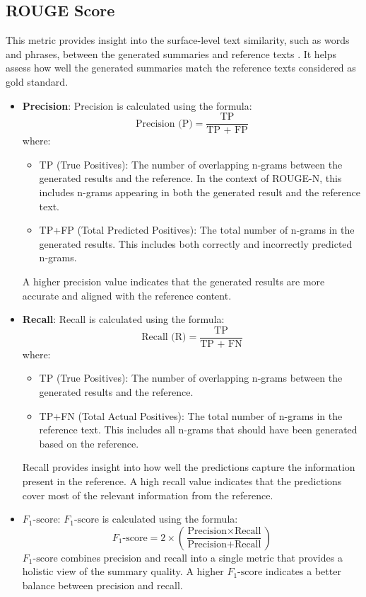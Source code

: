 \documentclass[runningheads]{llncs}
\begin{document}
\subsection{ROUGE Score}
This metric provides insight into the surface-level text similarity, such as words and phrases, between the generated summaries and reference texts \cite{Lin2004}. It helps assess how well the generated summaries match the reference texts considered as gold standard.
\begin{itemize}
    \item \textbf{Precision}: Precision is calculated using the formula:
    \[
    \text{Precision (P)} = \frac{\text{TP}}{\text{TP + FP}}
    \]
    where:
    \begin{itemize}
        \item TP (True Positives): The number of overlapping n-grams between the generated results and the reference. In the context of ROUGE-N, this includes n-grams appearing in both the generated result and the reference text.
        \item TP+FP (Total Predicted Positives): The total number of n-grams in the generated results. This includes both correctly and incorrectly predicted n-grams.
    \end{itemize}
    A higher precision value indicates that the generated results are more accurate and aligned with the reference content.

    \item \textbf{Recall}: Recall is calculated using the formula:
    \[
    \text{Recall (R)} = \frac{\text{TP}}{\text{TP + FN}}
    \]
    where:
    \begin{itemize}
        \item TP (True Positives): The number of overlapping n-grams between the generated results and the reference.
        \item TP+FN (Total Actual Positives): The total number of n-grams in the reference text. This includes all n-grams that should have been generated based on the reference.
    \end{itemize}
    Recall provides insight into how well the predictions capture the information present in the reference. A high recall value indicates that the predictions cover most of the relevant information from the reference.

    \item \textbf{\( F_{1}\text{-score} \)}: 
    \( F_{1}\text{-score} \) is calculated using the formula:
    \[
    F_{1}\text{-score} = 2 \times \left( \frac{\text{Precision} \times \text{Recall}}{\text{Precision} + \text{Recall}} \right)
    \]
    \( F_{1}\text{-score} \) combines precision and recall into a single metric that provides a holistic view of the summary quality. A higher \( F_{1}\text{-score} \) indicates a better balance between precision and recall.
\end{itemize}
    
\end{document}
